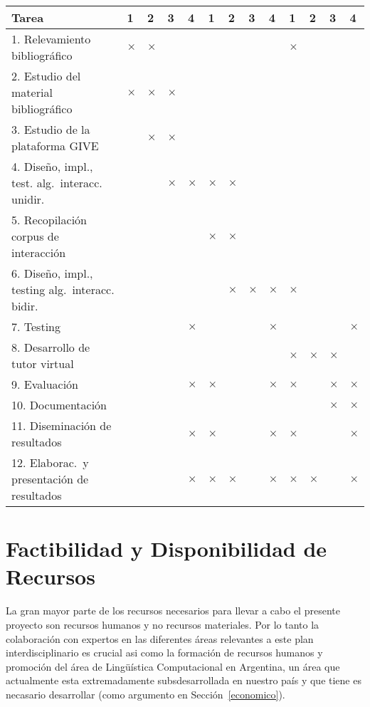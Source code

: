 \documentclass[11pt]{article}
\begin{document}
{\footnotesize
\begin{center}
\begin{tabular}{|p{7cm}||p{2mm}|p{2mm}|p{2mm}|p{2mm}||p{2mm}|p{2mm}|p{2mm}|p{2mm
}||p{2mm}|p{2mm}|p{2mm}|p{2mm}||}
\hline
 \rowcolor[rgb]{0.8,0.8,0.8}\hspace{3.5cm}Tarea & 1 & 2 & 3 & 4 & 1 & 2 & 3 & 4
& 1 & 2 & 3 & 4\\
\hline 1. Relevamiento bibliogr\'afico & $\times$ & $\times$
&&&&&&&$\times$&&&\\
\hline 2. Estudio del material bibliogr\'afico & $\times$ & $\times$ & $\times$
&  &&&&&&&&\\
\hline 3. Estudio de la plataforma GIVE & & $\times$ &$\times$&&&&&&&&&\\
\hline 4. Dise\~no, impl., test. alg.\ interacc. unidir. & & & $\times$
& $\times$&$\times$&$\times$&&&&&&\\
\hline 5. Recopilaci\'on corpus de interacci\'on & & & &&$\times$
&$\times$&&&&&&\\
\hline 6. Dise\~no, impl., testing alg.\ interacc. bidir. & & &  &
&&$\times$&$\times$&$\times$&$\times$&&&\\
\hline 7. Testing &&&&$\times$&&&&$\times$&&&&$\times$\\
\hline 8. Desarrollo de tutor virtual &&&&&&&&&$\times$&$\times$&$\times$&\\
\hline 9. Evaluaci\'on
&&&&$\times$&$\times$&&&$\times$&$\times$&&$\times$&$\times$\\
\hline 10. Documentaci\'on &&&&&&&&&&&$\times$&$\times$\\
\hline 11. Diseminaci\'on de resultados
&&&&$\times$&$\times$&&&$\times$&$\times$&&&$\times$\\
\hline 12. Elaborac.\ y presentaci\'on de resultados 
&&&&$\times$&$\times$&$\times$&&$\times$&$\times$&$\times$&&$\times$\\\hline
\end{tabular}\end{center}
}

\section{Factibilidad y Disponibilidad de Recursos}

La gran mayor parte de los recursos necesarios para llevar a cabo el presente
proyecto son recursos humanos y no recursos materiales. Por lo tanto la
colaboraci\'on con expertos en las diferentes \'areas relevantes a este plan
interdisciplinario es crucial asi como la formaci\'on de recursos humanos y
promoci\'on del \'area de Ling\"u\'istica Computacional en Argentina, un \'area
que actualmente esta extremadamente subsdesarrollada en nuestro pa\'is y que
tiene es necasario desarrollar (como argumento en Secci\'on~\ref{economico}). 
\end{document}

